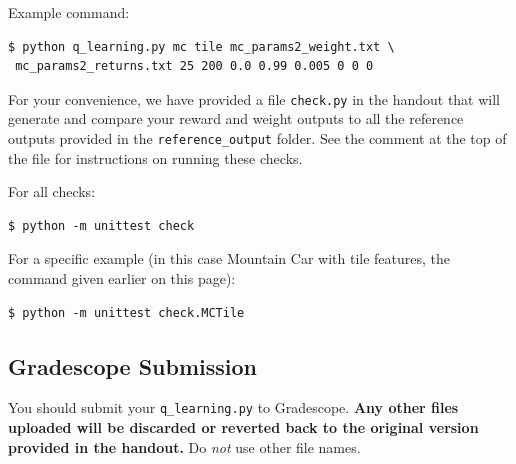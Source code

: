 \documentclass[11pt,addpoints,answers]{exam}
\begin{document}
Example command:
\begin{lstlisting}[language=Shell]
$ python q_learning.py mc tile mc_params2_weight.txt \
 mc_params2_returns.txt 25 200 0.0 0.99 0.005 0 0 0
\end{lstlisting}

For your convenience, we have provided a file \texttt{check.py} in the handout that will generate and compare your reward and weight outputs to all the reference outputs provided in the \texttt{reference\_output} folder. See the comment at the top of the file for instructions on running these checks.

For all checks:
\begin{lstlisting}[language=Shell]
$ python -m unittest check
\end{lstlisting}

For a specific example (in this case Mountain Car with tile features, the command given earlier on this page):
\begin{lstlisting}[language=Shell]
$ python -m unittest check.MCTile
\end{lstlisting}

\subsection{Gradescope Submission}

You should submit your \texttt{q\_learning.py} to Gradescope.
\textbf{Any other files uploaded will be discarded or reverted back to the original version provided in the handout.}
Do \textit{not} use other file names.
\end{document}

